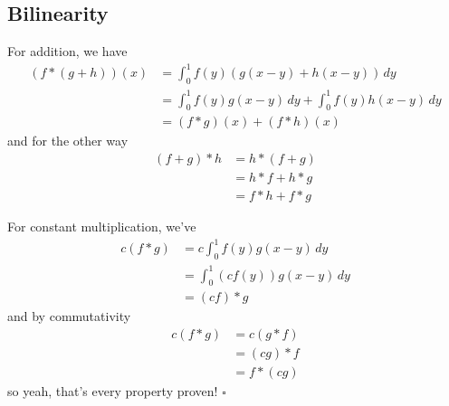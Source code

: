 \documentclass[12pt]{article}
\begin{document}
\pagebreak

\subsection{Bilinearity}

For addition, we have
\begin{align*}
  (f * (g + h))(x)
   & = \int_{0}^{1} f(y)(g(x-y)+h(x-y))\,dy                      \\
   & = \int_{0}^{1} f(y)g(x-y)\,dy + \int_{0}^{1} f(y)h(x-y)\,dy \\
   & = (f * g)(x) + (f * h)(x)
\end{align*}
and for the other way
\begin{align*}
  (f + g) * h
   & = h * (f + g)   \\
   & = h * f + h * g \\
   & = f * h + f * g
\end{align*}

For constant multiplication, we've
\begin{align*}
  c(f * g)
   & = c\int_{0}^{1} f(y)g(x-y)\,dy   \\
   & = \int_{0}^{1} (cf(y))g(x-y)\,dy \\
   & = (cf) * g
\end{align*}
and by commutativity
\begin{align*}
  c(f * g)
   & = c(g *f)  \\
   & = (cg) * f \\
   & = f * (cg)
\end{align*}
so yeah, that's every property proven! $\square$
\end{document}
